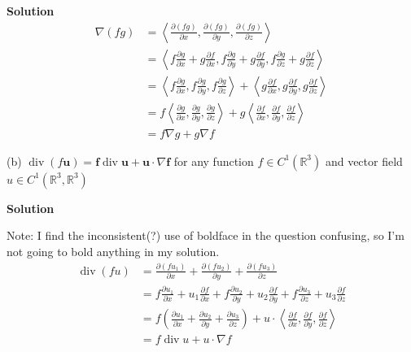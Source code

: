 \documentclass{article}
\begin{document}
\textbf{Solution}
%
\begin{align*}
    \nabla (f g)
        &= \left\langle
                \frac{\partial (f g)}{\partial x},
                \frac{\partial (f g)}{\partial y},
                \frac{\partial (f g)}{\partial z}
           \right\rangle \\
        &= \left\langle
                f \frac{\partial g}{\partial x} + g \frac{\partial f}{\partial x},
                f \frac{\partial g}{\partial y} + g \frac{\partial f}{\partial y},
                f \frac{\partial g}{\partial z} + g \frac{\partial f}{\partial z}
           \right\rangle \\
        &= \left\langle
                f \frac{\partial g}{\partial x},
                f \frac{\partial g}{\partial y},
                f \frac{\partial g}{\partial z}
           \right\rangle
           +
           \left\langle
                g \frac{\partial f}{\partial x},
                g \frac{\partial f}{\partial y},
                g \frac{\partial f}{\partial z}
           \right\rangle \\
        &= f \left\langle
                \frac{\partial g}{\partial x},
                \frac{\partial g}{\partial y},
                \frac{\partial g}{\partial z}
           \right\rangle
           +
           g \left\langle
                \frac{\partial f}{\partial x},
                \frac{\partial f}{\partial y},
                \frac{\partial f}{\partial z}
           \right\rangle \\
        &= f \nabla g + g \nabla f
\end{align*}

\vspace{5mm}
(b) $\operatorname{div}(f \mathbf{u}) = \mathbf{f} \operatorname{div} \mathbf{u} + \mathbf{u} \cdot \nabla \mathbf{f}$
for any function $f \in C^{1}\left(\mathbb{R}^{3}\right)$ and vector field
$u \in C^{1}\left(\mathbb{R}^{3}, \mathbb{R}^{3}\right)$

\textbf{Solution}

Note: I find the inconsistent(?) use of boldface in the question
confusing, so I'm not going to bold anything in my solution.
%
\begin{align*}
    \operatorname{div}(f u)
        &= \frac{\partial (f u_1)}{\partial x}
           + \frac{\partial (f u_2)}{\partial y}
           + \frac{\partial (f u_3)}{\partial z}
           \\
        &= f \frac{\partial u_1}{\partial x} + u_1 \frac{\partial f}{\partial x}
           + f \frac{\partial u_2}{\partial y} + u_2 \frac{\partial f}{\partial y}
           + f \frac{\partial u_3}{\partial z} + u_3 \frac{\partial f}{\partial z}
           \\
        &= f \left(
            \frac{\partial u_1}{\partial x}
            + \frac{\partial u_2}{\partial y}
            + \frac{\partial u_3}{\partial z}
           \right) +
           u \cdot \left\langle
                \frac{\partial f}{\partial x},
                \frac{\partial f}{\partial y},
                \frac{\partial f}{\partial z}
           \right\rangle \\
        &= f \operatorname{div} u + u \cdot \nabla f
\end{align*}
\end{document}
